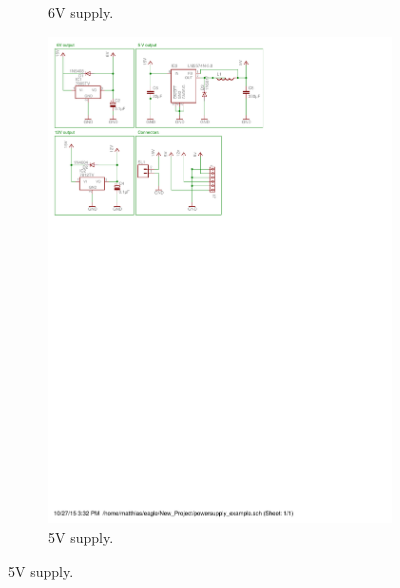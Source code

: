 \begin{figure}[H]
\begin{subfigure}{0.3\linewidth}
\caption{6V supply.}
\label{fig::sch_power_6V}
\end{subfigure}
\begin{subfigure}{0.4\linewidth}
\centering
\includegraphics[scale=0.8,trim={5.3cm 24cm 7.8cm 0.6cm},clip]{img/powersupply.pdf}
\caption{5V supply.}
\label{fig::sch_power_5V}
\end{subfigure}


\end{figure}
